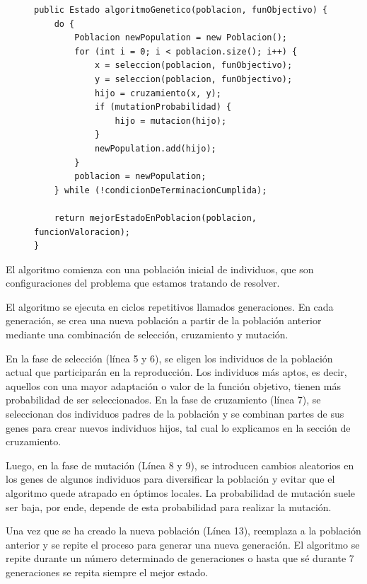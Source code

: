 \begin{figure}[H]


\begin{lstlisting}[style=javaStyle, caption={Algoritmo genético en Java}, label={lst:genetic_algorithm}]
public Estado algoritmoGenetico(poblacion, funObjectivo) {
    do {
        Poblacion newPopulation = new Poblacion();
        for (int i = 0; i < poblacion.size(); i++) {
            x = seleccion(poblacion, funObjectivo);
            y = seleccion(poblacion, funObjectivo);
            hijo = cruzamiento(x, y);
            if (mutationProbabilidad) {
                hijo = mutacion(hijo);
            }
            newPopulation.add(hijo);
        }
        poblacion = newPopulation;
    } while (!condicionDeTerminacionCumplida);
    
    return mejorEstadoEnPoblacion(poblacion, funcionValoracion);
}
\end{lstlisting}
\end{figure}

El algoritmo comienza con una población inicial de individuos, que son configuraciones del problema que estamos tratando de resolver. 

El algoritmo se ejecuta en ciclos repetitivos llamados generaciones. En cada generación, se crea una nueva población a partir de la población anterior mediante una combinación de selección, cruzamiento y mutación.

En la fase de selección (línea 5 y 6), se eligen los individuos de la población actual que participarán en la reproducción.
Los individuos más aptos, es decir, aquellos con una mayor adaptación o valor de la función objetivo, tienen más probabilidad de ser seleccionados.
En la fase de cruzamiento (línea 7), se seleccionan dos individuos padres de la población y se combinan partes de sus genes para crear nuevos individuos hijos, tal cual lo explicamos en la sección de cruzamiento.

Luego, en la fase de mutación (Línea 8 y 9), se introducen cambios aleatorios en los genes de algunos individuos para diversificar la población y evitar que el algoritmo quede atrapado en óptimos locales. La probabilidad de mutación suele ser baja, por ende, depende de esta probabilidad para realizar la mutación.

Una vez que se ha creado la nueva población (Línea 13), reemplaza a la población anterior y se repite el proceso para generar una nueva generación. El algoritmo se repite durante un número determinado de generaciones o hasta que sé durante 7 generaciones se repita siempre el mejor estado.

